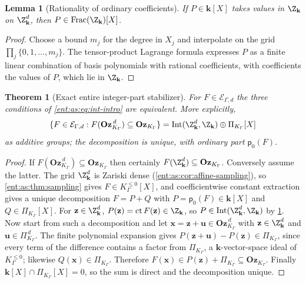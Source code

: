 \documentclass[11pt]{article}
\newtheorem{theorem}{Theorem}[section]
\theoremstyle{plain}
\newtheorem{lemma}[lemma]{Lemma}
\theoremstyle{plain}
\theoremstyle{plain}
\theoremstyle{definition}
\theoremstyle{definition}
\theoremstyle{definition}
\theoremstyle{definition}
\theoremstyle{remark}
\newcommand{\K}{K_\Gamma}\newcommand{\KD}{K_\Delta}
\newcommand{\kk}{\mathbf k}\newcommand{\PP}{\mathbb P}
\newcommand{\Oz}{\mathbf{Oz}}\newcommand{\Ed}{\mathcal E_{\Gamma,d}}
\newcommand{\Kle}{K_\Gamma^{\le0}}\DeclareMathOperator{\Jac}{Jac}
\newcommand{\Zk}{\Z_{\kk}}\newcommand{\OzK}{\Oz_{\K}}
\newcommand{\PiK}{\Pi_{\K}}\newcommand{\pg}{\mathsf p}
\DeclareMathOperator{\Int}{Int}\DeclareMathOperator{\ct}{ct}
\begin{document}
\begin{lemma}[Rationality of ordinary coefficients]\label{ent:as:lem:rational}
If $P\in\kk[X]$ takes values in $\Zk$ on $\Zk^d$, then
$P\in\operatorname{Frac}(\Zk)[X]$.
\end{lemma}
\begin{proof}
Choose a bound $m_j$ for the degree in $X_j$ and interpolate on the grid
$\prod_j\{0,1,\ldots,m_j\}$. The tensor-product Lagrange formula expresses
$P$ as a finite linear combination of basis polynomials with rational
coefficients, with coefficients the values of $P$, which lie in $\Zk$.
\end{proof}

\begin{theorem}[Exact entire integer-part stabilizer]\label{ent:as:thm:integer}
For $F\in\Ed$ the three conditions of \eqref{ent:as:eq:int-intro} are
equivalent. More explicitly,
\begin{equation}\label{ent:as:eq:integer-classification}
 \{F\in\Ed:F(\OzK^{\,d})\subseteq\OzK\}
 =\Int(\Zk^d,\Zk)\oplus\PiK[X]
\end{equation}
as additive groups; the decomposition is unique, with ordinary part
$\pg_0(F)$.
\end{theorem}
\begin{proof}
If $F(\OzK^{\,d})\subseteq\OzK$ then certainly $F(\Zk^d)\subseteq\OzK$.
Conversely assume the latter. The grid $\Zk^d$ is Zariski dense
(\cref{ent:as:cor:affine-sampling}), so \cref{ent:as:thm:sampling} gives
$F\in\Kle[X]$, and coefficientwise constant extraction gives a unique
decomposition $F=P+Q$ with $P=\pg_0(F)\in\kk[X]$ and $Q\in\PiK[X]$. For
$\mathbf z\in\Zk^d$, $P(\mathbf z)=\ct F(\mathbf z)\in\Zk$, so
$P\in\Int(\Zk^d,\Zk)$ by \cref{ent:as:lem:rational}. Now start from such a
decomposition and let $\mathbf x=\mathbf z+\mathbf u\in\OzK^{\,d}$ with
$\mathbf z\in\Zk^d$ and $\mathbf u\in\PiK^{\,d}$. The finite polynomial
expansion gives $P(\mathbf z+\mathbf u)-P(\mathbf z)\in\PiK$, since every term of
the difference contains a factor from $\PiK$, a $\kk$-vector-space ideal of
$\Kle$; likewise $Q(\mathbf x)\in\PiK$. Therefore
$F(\mathbf x)\in P(\mathbf z)+\PiK\subseteq\OzK$. Finally
$\kk[X]\cap\PiK[X]=0$, so the sum is direct and the decomposition unique.
\end{proof}
\end{document}
